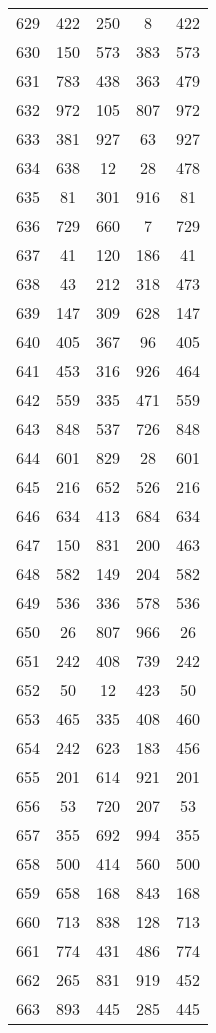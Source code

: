 \documentclass[a4paper,10pt,ngerman]{scrartcl}
\begin{document}
\begin{longtable}[c]{c|c|c|c|c}
    629 & 422 & 250 & 8 & 422 \\
    630 & 150 & 573 & 383 & 573 \\
    631 & 783 & 438 & 363 & 479 \\
    632 & 972 & 105 & 807 & 972 \\
    633 & 381 & 927 & 63 & 927 \\
    634 & 638 & 12 & 28 & 478 \\
    635 & 81 & 301 & 916 & 81 \\
    636 & 729 & 660 & 7 & 729 \\
    637 & 41 & 120 & 186 & 41 \\
    638 & 43 & 212 & 318 & 473 \\
    639 & 147 & 309 & 628 & 147 \\
    640 & 405 & 367 & 96 & 405 \\
    641 & 453 & 316 & 926 & 464 \\
    642 & 559 & 335 & 471 & 559 \\
    643 & 848 & 537 & 726 & 848 \\
    644 & 601 & 829 & 28 & 601 \\
    645 & 216 & 652 & 526 & 216 \\
    646 & 634 & 413 & 684 & 634 \\
    647 & 150 & 831 & 200 & 463 \\
    648 & 582 & 149 & 204 & 582 \\
    649 & 536 & 336 & 578 & 536 \\
    650 & 26 & 807 & 966 & 26 \\
    651 & 242 & 408 & 739 & 242 \\
    652 & 50 & 12 & 423 & 50 \\
    653 & 465 & 335 & 408 & 460 \\
    654 & 242 & 623 & 183 & 456 \\
    655 & 201 & 614 & 921 & 201 \\
    656 & 53 & 720 & 207 & 53 \\
    657 & 355 & 692 & 994 & 355 \\
    658 & 500 & 414 & 560 & 500 \\
    659 & 658 & 168 & 843 & 168 \\
    660 & 713 & 838 & 128 & 713 \\
    661 & 774 & 431 & 486 & 774 \\
    662 & 265 & 831 & 919 & 452 \\
    663 & 893 & 445 & 285 & 445 \\

\end{longtable}
\end{document}
